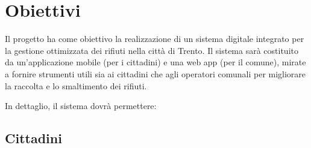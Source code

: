 \section{Obiettivi}

Il progetto ha come obiettivo la realizzazione di un sistema digitale integrato per la gestione ottimizzata dei rifiuti nella citt\`a di Trento. Il sistema sar\`a costituito da un'applicazione mobile (per i cittadini) e una web app (per il comune), mirate a fornire strumenti utili sia ai cittadini che agli operatori comunali per migliorare la raccolta e lo smaltimento dei rifiuti.

In dettaglio, il sistema dovr\`a permettere:

\subsection{Cittadini}

